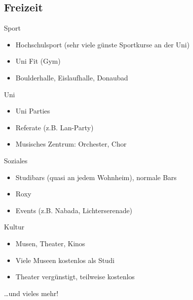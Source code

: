 \documentclass[
	aspectratio=169, 
	10pt 
]{beamer}
\begin{document}
\subsection{Freizeit}
\begin{frame}{\insertsubsection}
    \begin{fancycolumns}[T, columns=2]
        \begin{definition}{Sport}
            \begin{itemize}
                \item Hochschulsport (sehr viele günste Sportkurse an der Uni)
                \item Uni Fit (Gym)
                \item Boulderhalle, Eislaufhalle, Donaubad
            \end{itemize}
        \end{definition}

        \begin{definition}{Uni}
            \begin{itemize}
                \item Uni Parties
                \item Referate (z.B. Lan-Party)
                \item Musisches Zentrum: Orchester, Chor
            \end{itemize}
        \end{definition}
        
        \nextcolumn
        \begin{definition}{Soziales}
            \begin{itemize}
                \item Studibars (quasi an jedem Wohnheim), normale Bars
                \item Roxy
                \item Events (z.B. Nabada, Lichterserenade) 
            \end{itemize}
        \end{definition}

        \begin{definition}{Kultur}
            \begin{itemize}
                \item Musen, Theater, Kinos
                \item Viele Museen kostenlos als Studi
                \item Theater vergünstigt, teilweise kostenlos
            \end{itemize}
        \end{definition}

    \end{fancycolumns}
    \dots und vieles mehr!
\end{frame}
\end{document}
